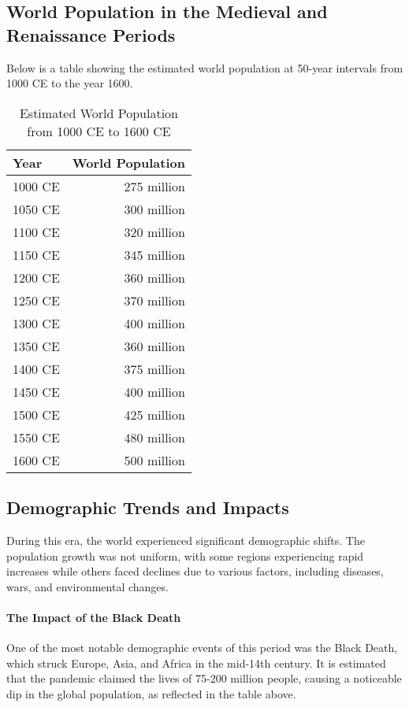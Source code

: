 \documentclass{book}
\begin{document}
\subsection*{World Population in the Medieval and Renaissance Periods}
Below is a table showing the estimated world population at 50-year intervals from 1000 CE to the year 1600.

\begin{table}[h!]
\centering
\begin{tabular}{|l|r|}
\hline
Year & World Population \\
\hline
1000 CE & 275 million \\
1050 CE & 300 million \\
1100 CE & 320 million \\
1150 CE & 345 million \\
1200 CE & 360 million \\
1250 CE & 370 million \\
1300 CE & 400 million \\
1350 CE & 360 million \\ %
1400 CE & 375 million \\
1450 CE & 400 million \\
1500 CE & 425 million \\
1550 CE & 480 million \\
1600 CE & 500 million \\
\hline
\end{tabular}
\caption{Estimated World Population from 1000 CE to 1600 CE}
\label{tab:world_population_1000_1600}
\end{table}

\subsection*{Demographic Trends and Impacts}
During this era, the world experienced significant demographic shifts. The population growth was not uniform, with some regions experiencing rapid increases while others faced declines due to various factors, including diseases, wars, and environmental changes.

\paragraph{The Impact of the Black Death}
One of the most notable demographic events of this period was the Black Death, which struck Europe, Asia, and Africa in the mid-14th century. It is estimated that the pandemic claimed the lives of 75-200 million people, causing a noticeable dip in the global population, as reflected in the table above.
\end{document}
